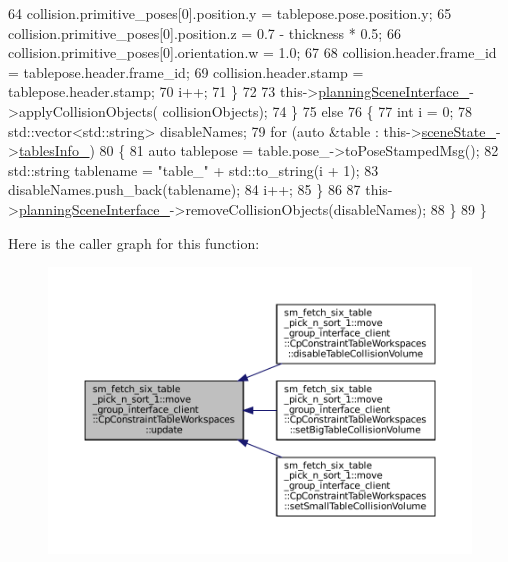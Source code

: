 \begin{DoxyCode}
64                     collision.primitive\_poses[0].position.y = tablepose.pose.position.y;
65                     collision.primitive\_poses[0].position.z = 0.7 - thickness * 0.5;
66                     collision.primitive\_poses[0].orientation.w = 1.0;
67 
68                     collision.header.frame\_id = tablepose.header.frame\_id;
69                     collision.header.stamp = tablepose.header.stamp;
70                     i++;
71                 \}
72 
73                 this->\hyperlink{classsm__fetch__six__table__pick__n__sort__1_1_1move__group__interface__client_1_1CpConstraintTableWorkspaces_a20662ef09bbd5c94f6ec8b0ee8a6231b}{planningSceneInterface\_}->applyCollisionObjects(
      collisionObjects);
74             \}
75             \textcolor{keywordflow}{else}
76             \{
77                 \textcolor{keywordtype}{int} i = 0;
78                 std::vector<std::string> disableNames;
79                 \textcolor{keywordflow}{for} (\textcolor{keyword}{auto} &table : this->\hyperlink{classsm__fetch__six__table__pick__n__sort__1_1_1move__group__interface__client_1_1CpConstraintTableWorkspaces_ab2dff81f5735a98cffd13a4141d79e33}{sceneState\_}->\hyperlink{classsm__fetch__six__table__pick__n__sort__1_1_1cl__perception__system_1_1CpSceneState_a2de6a25cdfe869099984fbf8225874cd}{tablesInfo\_})
80                 \{
81                     \textcolor{keyword}{auto} tablepose = table.pose\_->toPoseStampedMsg();
82                     std::string tablename = \textcolor{stringliteral}{"table\_"} + std::to\_string(i + 1);
83                     disableNames.push\_back(tablename);
84                     i++;
85                 \}
86 
87                 this->\hyperlink{classsm__fetch__six__table__pick__n__sort__1_1_1move__group__interface__client_1_1CpConstraintTableWorkspaces_a20662ef09bbd5c94f6ec8b0ee8a6231b}{planningSceneInterface\_}->removeCollisionObjects(disableNames);
88             \}
89         \}
\end{DoxyCode}
Here is the caller graph for this function\+:
\nopagebreak
\begin{figure}[H]
\begin{center}
\leavevmode
\includegraphics[width=350pt]{classsm__fetch__six__table__pick__n__sort__1_1_1move__group__interface__client_1_1CpConstraintTableWorkspaces_a2588601a0f45af921e1864f8ba765c51_icgraph}
\end{center}
\end{figure}


